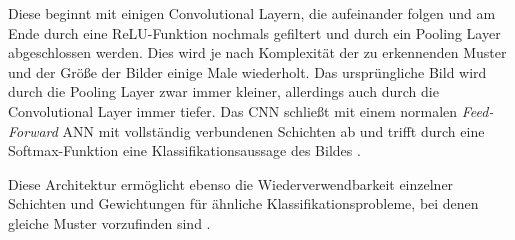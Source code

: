 Diese beginnt mit einigen Convolutional Layern, die aufeinander folgen und am Ende durch eine ReLU-Funktion nochmals gefiltert und durch ein Pooling Layer abgeschlossen werden. Dies wird je nach Komplexität der zu erkennenden Muster und der Größe der Bilder einige Male wiederholt. Das ursprüngliche Bild wird durch die Pooling Layer zwar immer kleiner, allerdings auch durch die Convolutional Layer immer tiefer. Das CNN schließt mit einem normalen \textit{Feed-Forward} ANN mit vollständig verbundenen Schichten ab und trifft durch eine Softmax-Funktion eine Klassifikationsaussage des Bildes \cite{AurelienGeron.2018}. 

Diese Architektur ermöglicht ebenso die Wiederverwendbarkeit einzelner Schichten und Gewichtungen für ähnliche Klassifikationsprobleme, bei denen gleiche Muster vorzufinden sind \cite{AurelienGeron.2018}.
